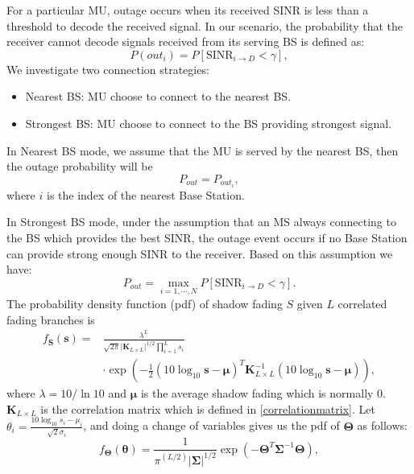  \par For a particular MU, outage occurs when its received SINR is less than a threshold to decode the received signal. In our scenario, the probability that the receiver cannot decode signals received from its serving BS is defined as:
 \begin{equation}
 P(out_{i}) = P[\text{SINR}_{i\to D} < \gamma],
 \end{equation}
 We investigate two connection strategies: 
 \begin{itemize}
 \item Nearest BS: MU choose to connect to the nearest BS.
 \item Strongest BS: MU choose to connect to the BS providing strongest signal.
 \end{itemize}
 \par In Nearest BS mode, we assume that the MU is served by the nearest BS, then the outage probability will be 
 \begin{equation}
 P_{out} = P_{out_{i}},
 \end{equation} 
 where $i$ is the index of the nearest Base Station. 
 \par In Strongest BS mode, under the assumption that an MS always connecting to the BS which provides the best SINR, the outage event occurs if no Base Station can provide strong enough SINR to the receiver. Based on this assumption we have:
 \begin{equation}
 P_{out} = \max_{i = 1,\cdots,N} P[\text{SINR}_{i\to D}<\gamma].
 \end{equation}
 The probability density function (pdf) of shadow fading $S$ given $L$ correlated fading branches is
 \begin{equation}
 \begin{split}
 f_{\mathbf{S}}(\mathbf{s}) = &\frac{\lambda^{L}}{\sqrt{2\pi}|\mathbf{K}_{L\times L}|^{1/2}\prod_{i=1}^{L}s_{i}}\\
 &\cdot\exp(-\frac{1}{2}(10\log_{10}\mathbf{s}-\boldsymbol{\mu})^{T}\mathbf{K}_{L\times L}^{-1}(10\log_{10}\mathbf{s}-\boldsymbol{\mu})),
 \end{split}
 \end{equation}
 where $\lambda = 10/\ln10$ and $\boldsymbol{\mu}$ is the average shadow fading which is normally $0$. $\mathbf{K}_{L\times L}$ is the correlation matrix which is defined in \eqref{correlationmatrix}. Let $\theta_{i} = \frac{10\log_{10}s_{i}-\mu_{i}}{\sqrt{2}\sigma_{i}}$, and doing a change of variables gives us the pdf of $\mathbf{\Theta}$ as follows:
 \begin{equation}
 f_{\mathbf{\Theta}}(\boldsymbol{\theta}) = \frac{1}{\pi^(L/2)|\mathbf{\Sigma}|^{1/2}}\exp(-\mathbf{\Theta}^{T}\mathbf{\Sigma}^{-1}\mathbf{\Theta}),
 \end{equation}
